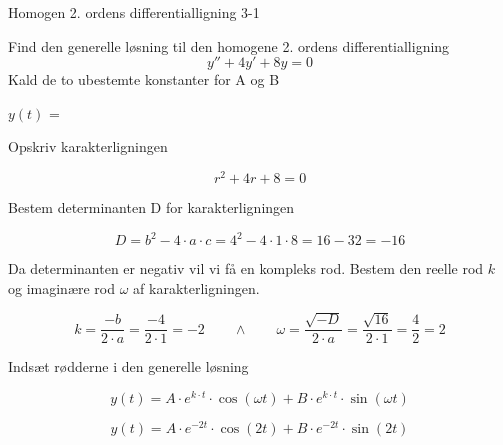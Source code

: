 \documentclass{article}
\begin{document}
\begin{exercise}{Homogen 2. ordens differentialligning 3-1}
	
	Find den generelle løsning til den homogene 2. ordens differentialligning
	\[
	y'' + 4y' + 8y = 0
	\]
	Kald de to ubestemte konstanter for A og B
	
	$y(t)$ = 
	
	
	\hint 
	
	Opskriv karakterligningen
	
	\hint
	
	\[
	r^2+ 4r + 8 = 0
	\]
	
	
	\hint
	
	Bestem determinanten D for karakterligningen
	
	
	\hint 
	\[
	D = b^2 - 4 \cdot a \cdot c = 4^2 - 4 \cdot 1 \cdot 8  = 16 -32 = -16
	\]
	
	\hint 
	Da determinanten er negativ vil vi få en kompleks rod. Bestem den reelle rod $k$ og imaginære rod $\omega$ af karakterligningen.
	
	
	\hint
	
	\[
	k = \frac{-b}{2 \cdot a} = \frac{-4}{2 \cdot 1} = -2 \qquad \wedge \qquad \omega = \frac{\sqrt{-D}}{2 \cdot a} = \frac{\sqrt{16}}{2 \cdot 1} = \frac{4}{2} = 2
	\]
	
	\hint
	
	Indsæt rødderne i den generelle løsning
	
	\hint
	\[
	y(t) = A \cdot e^{k \cdot t}  \cdot \cos(\omega t)+ B \cdot e^{k \cdot t}  \cdot \sin(\omega t)
	\]
	
	\hint
	
	\[
	y(t) = A \cdot e^{-2 t}  \cdot \cos(2 t)+ B \cdot e^{-2 t}  \cdot \sin(2 t)
	\]
	
\end{exercise}

\newpage
\end{document}
